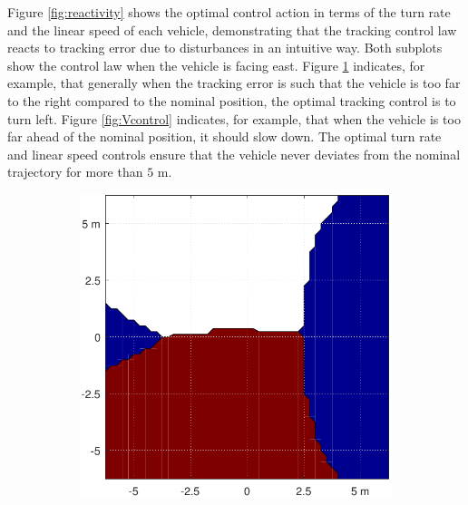 Figure \ref{fig:reactivity} shows the optimal control action in terms of the turn rate and the linear speed of each vehicle, demonstrating that the tracking control law reacts to tracking error due to disturbances in an intuitive way. Both subplots show the control law when the vehicle is facing east. Figure \ref{fig:Wcontrol} indicates, for example, that generally when the tracking error is such that the vehicle is too far to the right compared to the nominal position, the optimal tracking control is to turn left. Figure \ref{fig:Vcontrol} indicates, for example, that when the vehicle is too far ahead of the nominal position, it should slow down. The optimal turn rate and linear speed controls ensure that the vehicle never deviates from the nominal trajectory for more than $5$ m.

\begin{figure}[!htb]
  \centering
  \begin{subfigure}{0.5\textwidth}
    \includegraphics[width=\columnwidth]{figs/Wcontrol}
    \label{fig:Wcontrol}
  \end{subfigure}%
  \begin{subfigure}{0.5\textwidth}

\end{subfigure}
\end{figure}
